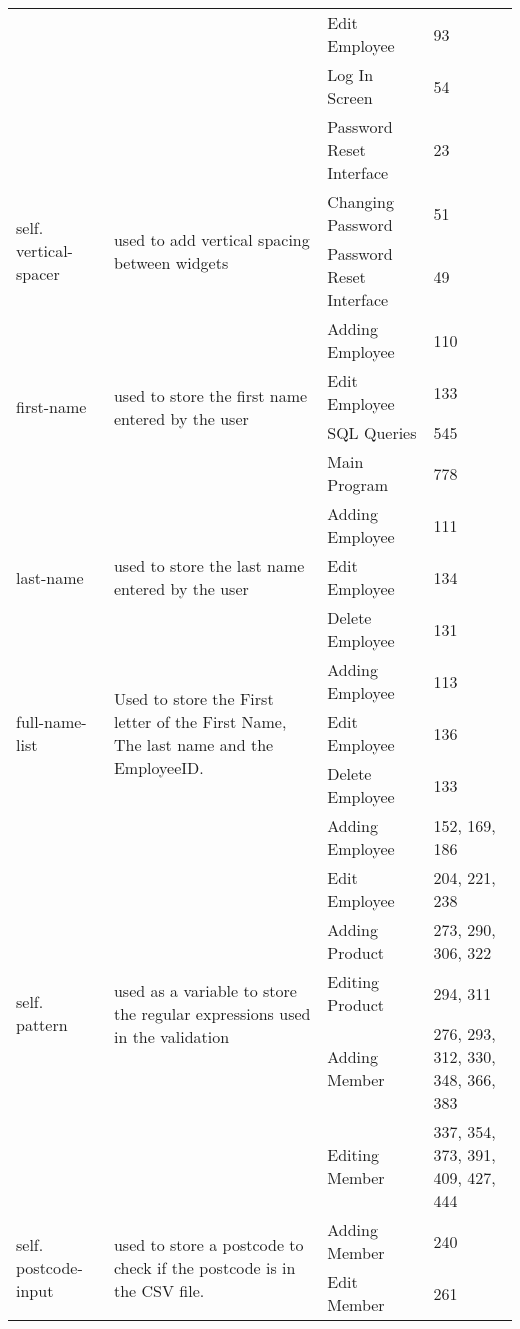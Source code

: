 \begin{center}
\begin{longtable}{|p{1.5cm}|p{4.5cm}|p{1.5cm}|p{3cm}|}
	& & Edit Employee & 93 \\ \cline{3-4}
	& & Log In Screen & 54 \\ \cline{3-4}
	& & Password Reset Interface & 23 \\ \hline
	\multirow{2}{1.5cm}{self. vertical- spacer} & \multirow{2}{4.5cm}{used to add vertical spacing between widgets} & Changing Password &  51 \\ \cline{3-4}
	& & Password Reset Interface &  49 \\ \hline
	\multirow{4}{1.5cm}{first-name} & \multirow{4}{4.5cm}{used to store the first name entered by the user} & Adding Employee &  110 \\ \cline{3-4}
	& & Edit Employee & 133 \\ \cline{3-4}
	& & SQL Queries &  545 \\ \cline{3-4}
	& & Main Program &  778 \\ \hline
	\multirow{3}{1.5cm}{last-name} & \multirow{3}{4.5cm}{used to store the last name entered by the user} & Adding Employee &  111 \\ \cline{3-4}
	& & Edit Employee & 134 \\ \cline{3-4}
	& & Delete Employee & 131 \\ \hline
	\multirow{3}{1.5cm}{full-name-list} & \multirow{3}{4.5cm}{Used to store the First letter of the First Name, The last name and the EmployeeID.} & Adding Employee &  113 \\ \cline{3-4}
	& & Edit Employee & 136 \\ \cline{3-4}
	& & Delete Employee & 133 \\ \hline
	\multirow{6}{1.5cm}{self. pattern} & \multirow{6}{4.5cm}{used as a variable to store the regular expressions used in the validation} & Adding Employee &  152, 169,  186 \\ \cline{3-4}
	& & Edit Employee & 204, 221, 238\\ \cline{3-4}
	& & Adding Product & 273, 290, 306, 322 \\
	& & Editing Product & 294, 311 \\ \cline{3-4}
	& & Adding Member &  276, 293, 312, 330, 348, 366, 383\\ \cline{3-4}
	& & Editing Member & 337, 354, 373, 391, 409, 427, 444 \\ \hline
	\multirow{3}{1.5cm}{self. postcode-input} & \multirow{3}{4.5cm}{used to store a postcode to check if the postcode is in the CSV file.} & Adding Member &  240 \\ \cline{3-4}
	& & Edit Member & 261 \\ \cline{3-4}

\end{longtable}
\end{center}
